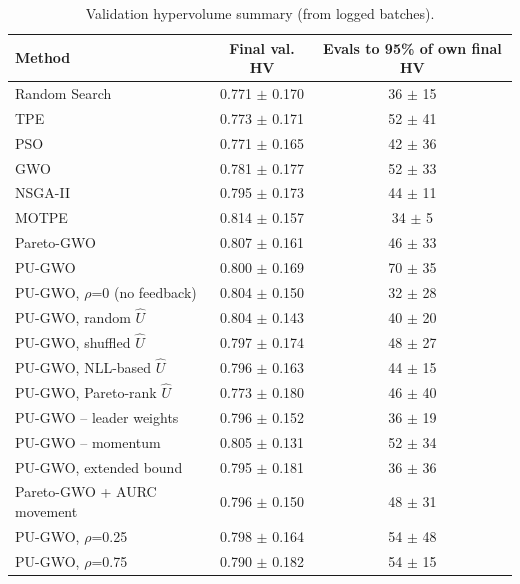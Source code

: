 \begin{table}[t]
\centering
\caption{Validation hypervolume summary (from logged batches).}
\label{tab:table_hv_summary}
\small
\begin{tabular}{lcc}
\toprule
Method & Final val. HV & Evals to 95\% of own final HV \\
\midrule
Random Search & 0.771 $\pm$ 0.170 & 36 $\pm$ 15 \\
TPE & 0.773 $\pm$ 0.171 & 52 $\pm$ 41 \\
PSO & 0.771 $\pm$ 0.165 & 42 $\pm$ 36 \\
GWO & 0.781 $\pm$ 0.177 & 52 $\pm$ 33 \\
NSGA-II & 0.795 $\pm$ 0.173 & 44 $\pm$ 11 \\
MOTPE & 0.814 $\pm$ 0.157 & 34 $\pm$ 5 \\
Pareto-GWO & 0.807 $\pm$ 0.161 & 46 $\pm$ 33 \\
PU-GWO & 0.800 $\pm$ 0.169 & 70 $\pm$ 35 \\
PU-GWO, $\rho$=0 (no feedback) & 0.804 $\pm$ 0.150 & 32 $\pm$ 28 \\
PU-GWO, random $\hat{U}$ & 0.804 $\pm$ 0.143 & 40 $\pm$ 20 \\
PU-GWO, shuffled $\hat{U}$ & 0.797 $\pm$ 0.174 & 48 $\pm$ 27 \\
PU-GWO, NLL-based $\hat{U}$ & 0.796 $\pm$ 0.163 & 44 $\pm$ 15 \\
PU-GWO, Pareto-rank $\hat{U}$ & 0.773 $\pm$ 0.180 & 46 $\pm$ 40 \\
PU-GWO -- leader weights & 0.796 $\pm$ 0.152 & 36 $\pm$ 19 \\
PU-GWO -- momentum & 0.805 $\pm$ 0.131 & 52 $\pm$ 34 \\
PU-GWO, extended bound & 0.795 $\pm$ 0.181 & 36 $\pm$ 36 \\
Pareto-GWO + AURC movement & 0.796 $\pm$ 0.150 & 48 $\pm$ 31 \\
PU-GWO, $\rho$=0.25 & 0.798 $\pm$ 0.164 & 54 $\pm$ 48 \\
PU-GWO, $\rho$=0.75 & 0.790 $\pm$ 0.182 & 54 $\pm$ 15 \\
\bottomrule
\end{tabular}
\end{table}
